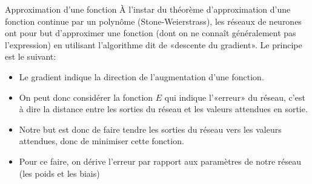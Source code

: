 \documentclass[ignorenonframetext,]{beamer}
\begin{document}
\begin{frame}{Approximation d'une fonction}
	À l'instar du théorème d'approximation d'une fonction continue par un polynôme (Stone-Weierstrass), les réseaux de neurones ont pour but d'approximer une fonction (dont on ne connaît généralement pas l'expression) en utilisant l'algorithme dit de «descente du gradient». Le principe est le suivant:
	\begin{itemize}
		\item Le gradient indique la direction de l'augmentation d'une fonction.
		\item On peut donc considérer la fonction $E$ qui indique l'«erreur» du réseau, c'est à dire la distance entre les sorties du réseau et les valeurs attendues en sortie.
		\item Notre but est donc de faire tendre les sorties du réseau vers les valeurs attendues, donc de minimiser cette fonction.
		\item Pour ce faire, on dérive l'erreur par rapport aux paramètres de notre réseau (les poids et les biais)
	\end{itemize}
\end{frame}
\end{document}
